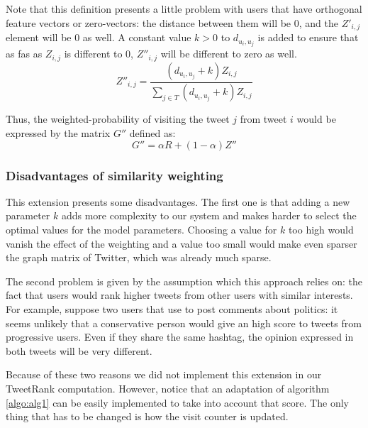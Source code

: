 Note that this definition presents a little problem with users that have orthogonal feature vectors or zero-vectors: the distance between them will be 0, and the $Z'_{i,j}$ element will be 0 as well. A constant value $k > 0$ to $d_{u_i,u_j}$ is added to ensure that as fas as $Z_{i,j}$ is different to 0, $Z''_{i,j}$ will be different to zero as well.
\begin{equation}
Z''_{i,j} = \frac{ (d_{u_i,u_j} + k) Z_{i,j}}{\sum_{j \in T}{(d_{u_i,u_j} + k) Z_{i,j}}}
\end{equation}

Thus, the weighted-probability of visiting the tweet $j$ from tweet $i$ would be expressed by the matrix $G''$ defined as:
\begin{equation}
G'' = \alpha R + (1 - \alpha) Z''
\end{equation}

\subsubsection*{Disadvantages of similarity weighting}
This extension presents some disadvantages. The first one is that adding a new parameter $k$ adds more complexity to our system and makes harder to select the optimal values for the model parameters. Choosing a value for $k$ too high would vanish the effect of the weighting and a value too small would make even sparser the graph matrix of Twitter, which was already much sparse.

The second problem is given by the assumption which this approach relies on: the fact that users would rank higher tweets from other users with similar interests. For example, suppose two users that use to post comments about politics: it seems unlikely that a conservative person would give an high score to tweets from progressive users. Even if they share the same hashtag, the opinion expressed in both tweets will be very different.

Because of these two reasons we did not implement this extension in our TweetRank computation. However, notice that an adaptation of algorithm \ref{algo:alg1} can be easily implemented to take into account that score. The only thing that has to be changed is how the visit counter is updated.
